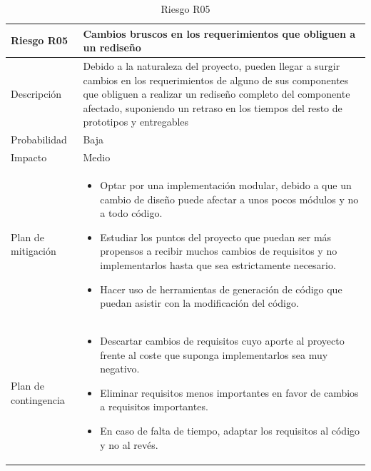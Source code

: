 \begin{table}[H]
	\centering
	\footnotesize
	\begin{tabularx}{\textwidth}{|l|X|}
		\hline
		\rowcolor[HTML]{C0C0C0} 
		\textbf{Riesgo R05}  & \textbf{Cambios bruscos en los requerimientos que obliguen a un rediseño} \\ \hline
		Descripción          & Debido a la naturaleza del proyecto, pueden llegar a surgir cambios en los requerimientos de alguno de sus componentes que obliguen a realizar un rediseño completo del componente afectado, suponiendo un retraso en los tiempos del resto de prototipos y entregables \\ \hline
		Probabilidad         & Baja \\ \hline
		Impacto              & Medio \\ \hline
		Plan de mitigación   & \begin{minipage}[t]{\linewidth}
			\begin{itemize}[leftmargin=*, noitemsep]
				\item Optar por una implementación modular, debido a que un cambio de diseño puede afectar a unos pocos módulos y no a todo código.
				\item Estudiar los puntos del proyecto que puedan ser más propensos a recibir muchos cambios de requisitos y no implementarlos hasta que sea estrictamente necesario.
				\item Hacer uso de herramientas de generación de código que puedan asistir con la modificación del código.
			\end{itemize}
		\end{minipage} \\ \hline
		Plan de contingencia & \begin{minipage}[t]{\linewidth}
			\begin{itemize}[leftmargin=*, noitemsep]
				\item Descartar cambios de requisitos cuyo aporte al proyecto frente al coste que suponga implementarlos sea muy negativo.
				\item Eliminar requisitos menos importantes en favor de cambios a requisitos importantes.
				\item En caso de falta de tiempo, adaptar los requisitos al código y no al revés.
			\end{itemize}
		\end{minipage} \\ \hline
	\end{tabularx}
	\caption{Riesgo R05}
	\label{tab:riesgo_5}
\end{table}

